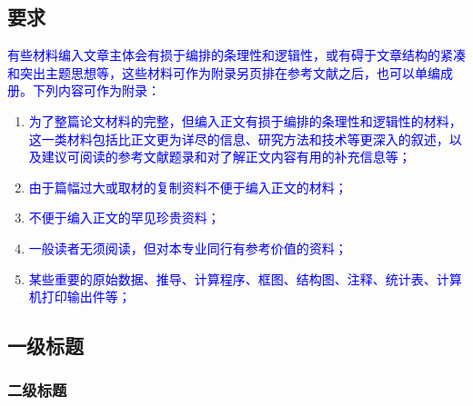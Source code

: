 \begin{appendices}
  \chapter{要求}

  \textcolor{blue}{
  有些材料编入文章主体会有损于编排的条理性和逻辑性，或有碍于文章结构的紧凑和突出主题思想等，这些材料可作为附录另页排在参考文献之后，也可以单编成册。下列内容可作为附录：
  }
  \begin{enumerate}
    \item \textcolor{blue}{为了整篇论文材料的完整，但编入正文有损于编排的条理性和逻辑性的材料，这一类材料包括比正文更为详尽的信息、研究方法和技术等更深入的叙述，以及建议可阅读的参考文献题录和对了解正文内容有用的补充信息等；}
    \item \textcolor{blue}{ 由于篇幅过大或取材的复制资料不便于编入正文的材料； }
    \item \textcolor{blue}{ 不便于编入正文的罕见珍贵资料； }
    \item \textcolor{blue}{ 一般读者无须阅读，但对本专业同行有参考价值的资料； }
    \item \textcolor{blue}{ 某些重要的原始数据、推导、计算程序、框图、结构图、注释、统计表、计算机打印输出件等； }
  \end{enumerate}

  \section{一级标题}
  \subsection{二级标题}
\end{appendices}
